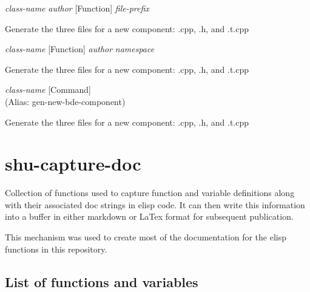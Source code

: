 \vspace{1em}
\noindent
{}
\usebox{\funcname}\emph{class-name} \emph{author}
 \hfill [Function]
\hspace*{\wd\funcname}\emph{file-prefix}

\begin{doc-string}
Generate the three files for a new component: .cpp, .h, and .t.cpp
\end{doc-string}

\vspace{1em}
\noindent
{}
\usebox{\funcname}\emph{class-name}
 \hfill [Function]
\hspace*{\wd\funcname}\emph{author} \emph{namespace}
\hspace*{\wd\funcname}

\begin{doc-string}
Generate the three files for a new component: .cpp, .h, and .t.cpp
\end{doc-string}

\vspace{1em}
\noindent
{}
\usebox{\funcname}\emph{class-name}
 \hfill [Command]\\%
 (Alias: gen-new-bde-component)

\begin{doc-string}
Generate the three files for a new component: .cpp, .h, and .t.cpp
\end{doc-string}

\eject
\section{shu-capture-doc}


Collection of functions used to capture function and variable definitions
along with their associated doc strings in elisp code.  It can then write
this information into a buffer in either markdown or LaTex format for
subsequent publication.

This mechanism was used to create most of the documentation for the elisp
functions in this repository.


\subsection{List of functions and variables}

